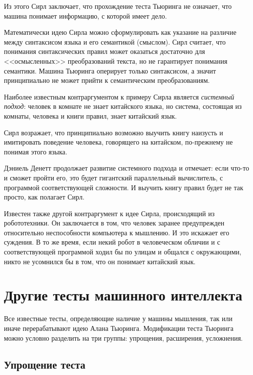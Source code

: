 \documentclass[a4paper,14pt]{scrartcl}
\begin{document}
Из этого Сирл заключает, что прохождение теста Тьюринга не означает, что машина понимает информацию, с которой имеет дело.

Математически идею Сирла можно сформулировать как указание на различие между синтаксисом языка и его семантикой (смыслом). Сирл считает, что понимания синтаксических правил может оказаться достаточно для <<осмысленных>> преобразований текста, но не гарантирует понимания семантики. Машина Тьюринга оперирует только синтаксисом, а значит принципиально не может прийти к семантическим преобразованиям.

Наиболее известным контраргументом к примеру Сирла является {\it системный подход}: человек в комнате не знает китайского языка, но система, состоящая из комнаты, человека и книги правил, знает китайский язык.

Сирл возражает, что принципиально возможно выучить книгу наизусть и имитировать поведение человека, говорящего на китайском, по-прежнему не понимая этого языка.

Дэниель Денетт продолжает развитие системного подхода и отмечает:
если что-то и сможет пройти его, это будет гигантский параллельный вычислитель, с программой соответствующей сложности. И выучить книгу правил будет не так просто, как полагает Сирл.

Известен также другой контраргумент к идее Сирла, происходящий из робототехники. Он заключается в том, что человек заранее предупрежден относительно неспособности компьютера к мышлению. И это искажает его суждения. В то же время, если некий робот в человеческом обличии и с соответствующей программой ходил бы по улицам и общался с окружающими, никто не усомнился бы в том, что он понимает китайский язык.

\section{Другие тесты машинного интеллекта}

Все известные тесты, определяющие наличие у машины мышления, так или иначе перерабатывают идею Алана Тьюринга. Модификации теста Тьюринга можно условно разделить на три группы: упрощения, расширения, усложнения.

\subsection{Упрощение теста}
\end{document}
